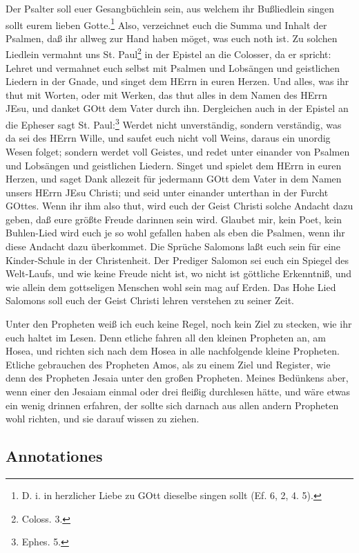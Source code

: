 Der Psalter soll euer Gesangbüchlein sein, aus welchem ihr Bußliedlein singen sollt eurem lieben Gotte.\footnote{D. i. in herzlicher Liebe zu GOtt dieselbe singen sollt (Ef. 6, 2, 4. 5).} Also, verzeichnet euch die Summa und Inhalt der Psalmen, daß ihr allweg zur Hand haben möget, was euch noth ist. Zu solchen Liedlein vermahnt uns St. Paul\footnote{Coloss. 3.} in der Epistel
an die Colosser, da er spricht: Lehret und vermahnet euch selbst mit Psalmen und Lobsängen und geistlichen Liedern in der Gnade, und singet dem HErrn in euren Herzen. Und alles, was ihr thut mit Worten, oder mit Werken, das thut alles in dem Namen des HErrn JEsu, und danket GOtt dem Vater durch ihn. Dergleichen auch in der Epistel an die Epheser sagt St. Paul:\footnote{Ephes. 5.} Werdet nicht unverständig, sondern verständig, was da sei des HErrn Wille, und saufet euch nicht voll Weins, daraus ein unordig Wesen folget; sondern werdet voll Geistes, und redet unter einander von Psalmen und Lobsängen und geistlichen Liedern. Singet und spielet dem HErrn in euren Herzen, und saget Dank allezeit für jedermann GOtt dem Vater in dem Namen unsers HErrn JEsu Christi; und seid unter einander unterthan in der Furcht GOttes. Wenn ihr ihm also thut, wird euch der Geist Christi solche Andacht dazu geben, daß eure größte Freude darinnen sein wird. Glaubet mir, kein Poet, kein Buhlen-Lied wird euch je so wohl gefallen haben als eben die Psalmen, wenn ihr diese Andacht dazu überkommet. Die Sprüche Salomons laßt euch sein für eine Kinder-Schule in der Christenheit. Der Prediger Salomon sei euch ein Spiegel des Welt-Laufs, und wie keine Freude nicht ist, wo nicht ist göttliche Erkenntniß, und wie allein dem gottseligen Menschen wohl sein mag auf Erden. Das Hohe Lied Salomons soll euch der Geist Christi lehren verstehen zu seiner Zeit.

Unter den Propheten weiß ich euch keine Regel, noch kein Ziel zu stecken, wie ihr euch haltet im Lesen. Denn etliche fahren all den kleinen Propheten an, am Hosea, und richten sich nach dem Hosea in alle nachfolgende kleine Propheten. Etliche gebrauchen des Propheten Amos, als zu einem Ziel und Register, wie denn des Propheten Jesaia unter den großen Propheten. Meines Bedünkens aber, wenn einer den
Jesaiam einmal oder drei fleißig durchlesen hätte, und wäre etwas ein wenig drinnen erfahren, der sollte sich darnach aus allen andern Propheten wohl richten, und sie darauf wissen zu ziehen.

\subsection{Annotationes}


